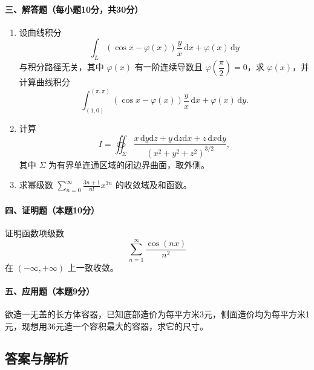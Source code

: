 \paragraph*{三、解答题（每小题10分，共30分）}
\begin{enumerate}
  \item 设曲线积分
  \[
    \int_L\left(\cos x-\varphi(x)\right)\frac yx\,\mathrm{d}x+\varphi(x)\,\mathrm{d}y
  \]
  与积分路径无关，其中 \(\varphi(x)\) 有一阶连续导数且
  \(\varphi\left(\dfrac{\pi}{2}\right)=0\)，求 \(\varphi(x)\)，并计算曲线积分
  \[
    \int_{(1,0)}^{(\pi,\pi)}
    \left(\cos x-\varphi(x)\right)\frac yx\,\mathrm{d}x+\varphi(x)\,\mathrm{d}y.
  \]

  \item 计算
  \[
    I=\oiint_\Sigma
    \frac{x\,\mathrm{d}y\mathrm{d}z+y\,\mathrm{d}z\mathrm{d}x+z\,\mathrm{d}x\mathrm{d}y}
    {(x^2+y^2+z^2)^{3/2}},
  \]
  其中 \(\Sigma\) 为有界单连通区域的闭边界曲面，取外侧。

  \item 求幂级数 \(\displaystyle \sum_{n=0}^{\infty}\frac{3n+1}{n!}x^{3n}\) 的收敛域及和函数。
\end{enumerate}

\paragraph*{四、证明题（本题10分）}
证明函数项级数
\[
  \sum_{n=1}^{\infty}\frac{\cos(nx)}{n^2}
\]
在 \((-\infty,+\infty)\) 上一致收敛。

\paragraph*{五、应用题（本题9分）}
欲造一无盖的长方体容器，已知底部造价为每平方米3元，侧面造价均为每平方米1元，现想用36元造一个容积最大的容器，求它的尺寸。

\subsection{答案与解析}


